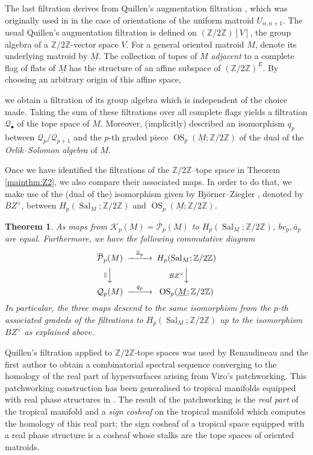 \documentclass{amsart}
\newcounter{mainTheorem}
\newtheorem{maintheorem}[mainTheorem]{Theorem}
\newcommand\Kcal{{\mathcal K}}
\newcommand\Qcal{{\mathcal Q}}
\newcommand\Pcal{{\mathcal P}}
\newcommand\ZZ{{\mathbb Z}}
\newcommand\Ztwo{{\mathbb Z}/2{\mathbb Z}}
\newcommand\qbv{{q}}
\newcommand\abv{{a}}
\DeclareMathOperator{\Sal}{Sal}
\DeclareMathOperator{\OS}{OS}
\begin{document}
The last filtration derives from Quillen's augmentation filtration \cite{Quillen}, which was originally used in \cite{RS} in the case of orientations of the uniform matroid $U_{n, n+1}$. 
The usual Quillen's augmentation filtration is defined on $(\mathbb{Z}/2\mathbb{Z})[V]$, the group algebra of a $\Ztwo$-vector space $V$.
For a general oriented matroid $M$, denote its underlying matroid by $\underline{M}$. The collection of topes of $M$ {\em adjacent} to a complete flag of flats of $\underline{M}$ has the structure of an affine subspace of $(\mathbb{Z}/2\mathbb{Z})^E$. By choosing an arbitrary origin of this affine space, {we obtain a filtration of its group algebra which is independent of the choice made.
Taking the sum of these filtrations over all complete flags yields a filtration $\Qcal_\bullet$ of the tope space of $M$.
Moreover, \cite{RS} (implicitly) described an isomorphism $\qbv_p$ between $\Qcal_p/\Qcal_{p+1}$ and the $p$-th graded piece $\OS_p(\underline{M};\Ztwo)$ of the dual of the {\em Orlik--Solomon algebra} of $\underline{M}$.

Once we have identified the filtrations of the $\ZZ/2\ZZ$--tope space in Theorem \ref{mainthm:Z2}, we also compare their associated maps. In order to do that, we make use of the (dual of the) isomorphism given by Bj\"{o}rner--Ziegler \cite{BZ92}, denoted by $BZ^\vee$, between $H_p(\Sal_M;\ZZ/2\ZZ)$ and $ \OS_p(\underline{M};\ZZ/2\ZZ)$.

\begin{maintheorem} \label{mainthm:maps}
 As maps from $\Kcal_p(M)=\overline{\Pcal}_p(M)$ to $H_p(\Sal_M;\Ztwo)$, $bv_p,\overline{\abv}_p$  are equal. Furthermore, we have the following commutative diagram
\begin{equation}
\begin{CD}
\overline{\Pcal}_p(M)    @>\overline{\abv}_p>>  H_p(\Sal_M;\Ztwo)\\
@V\parallel VV        @V BZ^\vee VV\\
\Qcal_p(M)      @>\qbv_p>>  \OS_p(\underline{M};\Ztwo)
\end{CD}
\end{equation}
In particular, the three maps descend to the same isomorphism from the $p$-th associated gradeds of the filtrations to $H_p(\Sal_M;\Ztwo)$ up to the isomorphism $BZ^\vee$ as explained above.
\end{maintheorem}

Quillen's filtration applied to $\mathbb{Z}/2\mathbb{Z}$-tope spaces was used by Renaudineau and the first author to obtain a combinatorial spectral sequence converging to the homology of the real part of hypersurfaces arising from Viro's patchworking. This patchworking construction has been generalised to tropical manifolds equipped with real phase structures in \cite{RRS2}. The result of the patchworking is the \emph{real part} of the tropical manifold and a {\em sign cosheaf} on the tropical manifold which computes the homology of this real part; the sign cosheaf of a tropical space equipped with a real phase structure is a cosheaf whose stalks are the tope spaces of oriented matroids.

}
\end{document}
